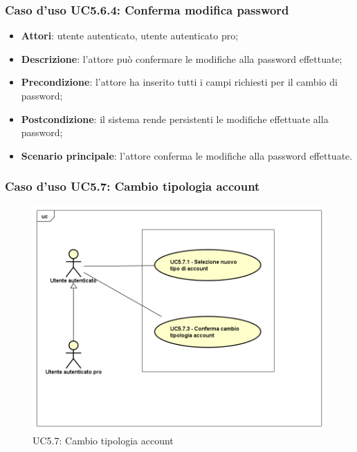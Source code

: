 \subsubsection{Caso d'uso UC5.6.4: Conferma modifica password}

\begin{itemize}
	\item \textbf{Attori}: utente autenticato, utente autenticato pro;
	\item \textbf{Descrizione}: l'attore può confermare le modifiche alla password effettuate;
	\item \textbf{Precondizione}: l'attore ha inserito tutti i campi richiesti per il cambio di password;
	\item \textbf{Postcondizione}: il sistema rende persistenti le modifiche effettuate alla password;
	\item \textbf{Scenario principale}: l'attore conferma le modifiche alla password effettuate.
\end{itemize}

\subsubsection{Caso d'uso UC5.7: Cambio tipologia account}
\label{UC5.7}
\begin{figure}[h]
	\centering
	\includegraphics[scale=0.5,keepaspectratio]{UML/UC5_7.png}
	\caption{UC5.7: Cambio tipologia account}
\end{figure}

